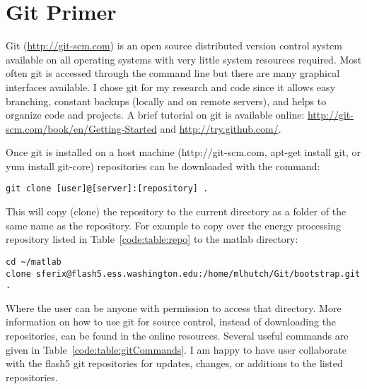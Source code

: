 \section{Git Primer}
\label{code:section:primer}

Git (\href{http://git-scm.com}{http://git-scm.com}) is an open source distributed version control system available on all operating systems with very little system resources required.
Most often git is accessed through the command line but there are many graphical interfaces available.
I chose git for my research and code since it allows easy branching, constant backups (locally and on remote servers), and helps to organize code and projects.
A brief tutorial on git is available online: \href{http://git-scm.com/book/en/Getting-Started}{http://git-scm.com/book/en/Getting-Started} and \href{http://try.github.com/}{http://try.github.com/}.

Once git is installed on a host machine (http://git-scm.com, apt-get install git, or yum install git-core) repositories can be downloaded with the command:

\begin{verbatim}
git clone [user]@[server]:[repository] .
\end{verbatim}

This will copy (clone) the repository to the current directory as a folder of the same name as the repository. 
For example to copy over the energy processing repository listed in Table~\ref{code:table:repo} to the matlab directory:

\begin{verbatim}
cd ~/matlab
clone sferix@flash5.ess.washington.edu:/home/mlhutch/Git/bootstrap.git .
\end{verbatim}

Where the user can be anyone with permission to access that directory.
More information on how to use git for source control, instead of downloading the repositories, can be found in the online resources.
Several useful commands are given in Table~\ref{code:table:gitCommands}.
I am happy to have user collaborate with the flash5 git repositories for updates, changes, or additions to the listed repositories.

